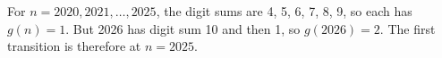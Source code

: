 For $ n=2020,2021,\ldots,2025 $, the digit sums are 4, 5, 6, 7, 8, 9, so each has $ g(n)=1 $. But 2026 has digit sum 10 and then 1, so $ g(2026)=2 $. The first transition is therefore at $\boxed{n=2025}$.
